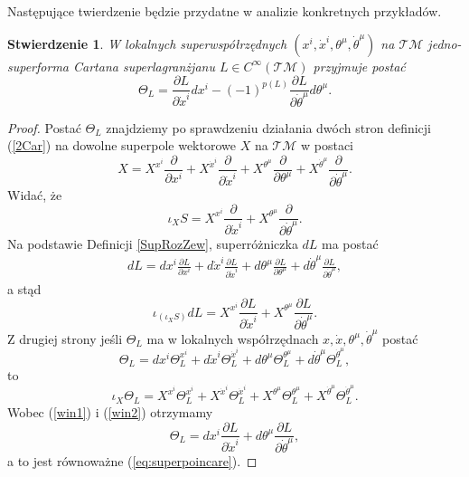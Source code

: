 \documentclass[11pt,a4paper]{report}
\newtheorem{proposition}[theorem]{Stwierdzenie}
\theoremstyle{definition}
\begin{document}
Następujące twierdzenie będzie przydatne w analizie konkretnych przykładów. \cite{carinena}

\begin{proposition}
W lokalnych superwspółrzędnych $(x^i, \dot x^i, \theta^\mu, \dot \theta^\mu)$ na $\mathcal{TM}$ jedno-superforma Cartana superlagranżjanu $L\in C^\infty(\mathcal{TM})$ przyjmuje postać
\begin{equation}
\label{eq:superpoincare}
\Theta_L = \frac{\partial L}{\partial \dot{x}^i} dx^i - (-1)^{p(L)}  \frac{\partial L}{\partial \dot{\theta}^\mu} d\theta^\mu.
\end{equation}
\end{proposition}

\begin{proof}
 Postać $\Theta_L$ znajdziemy po sprawdzeniu  działania dwóch stron definicji (\ref{2Car}) na dowolne superpole wektorowe $X$ na $\mathcal{TM}$ w postaci
 \begin{equation*}
  X = X^{x^i} \frac{\partial}{\partial x^i} + X^{\dot{x}^i} \frac{\partial}{\partial \dot{x}^i} + X^{\theta^\mu} \frac{\partial}{\partial \theta^\mu} + X^{\dot{\theta}^\mu} \frac{\partial}{\partial \dot{\theta}^\mu}.
 \end{equation*}
 Widać, że
 \begin{equation*}
  \iota_X S = X^{x^i} \frac{\partial}{\partial \dot{x}^i} + X^{\theta^\mu} \frac{\partial}{\partial \dot{\theta}^\mu}.
 \end{equation*}
 Na podstawie Definicji \ref{SupRozZew}, superróżniczka $dL$ ma postać
 \begin{equation*}
 \begin{gathered}
  dL = dx^i \frac{\partial L}{\partial x^i} + d\dot{x}^i \frac{\partial L}{\partial \dot{x}^i} + d\theta^\mu \frac{\partial L}{\partial \theta^\mu } + d\dot{\theta}^\mu \frac{\partial L}{\partial \dot{\theta}^\mu},
 \end{gathered}
 \end{equation*}
 a stąd
 \begin{equation}\label{win1}
  \iota_{(\iota_X S)} dL = X^{x^i} \frac{\partial L}{\partial \dot{x}^i} + X^{\theta^\mu} \frac{\partial L}{\partial \dot{\theta}^\mu}.
 \end{equation}
 Z drugiej strony jeśli $\Theta_L$ ma  w lokalnych wsp\'o\l rz\k ednach $x,\dot x,\theta^\mu,\dot\theta^\mu$ posta\'c $$\Theta_L = dx^i \Theta^{x^i}_L + d \dot x^i \Theta^{\dot{x}^i}_L + d \theta^\mu \Theta^{\theta^\mu}_L + d \dot \theta^\mu \Theta^{\dot{\theta}^\mu}_L,$$ to
 \begin{equation}\label{win2}
  \iota_X \Theta_L = X^{x^i} \Theta^{x^i}_L + X^{\dot x^i} \Theta^{\dot x^i}_L + X^{\theta^\mu} \Theta^{\theta^\mu}_L + X^{\dot \theta^\mu} \Theta^{\dot \theta^\mu}_L\!.
 \end{equation}
 Wobec (\ref{win1}) i (\ref{win2}) otrzymamy $$\Theta_L = dx^i \frac{\partial L}{\partial \dot{x}^i} + d\theta^\mu \frac{\partial L}{\partial \dot{\theta}^\mu},$$ a to jest równoważne (\ref{eq:superpoincare}).
\end{proof}
\end{document}
